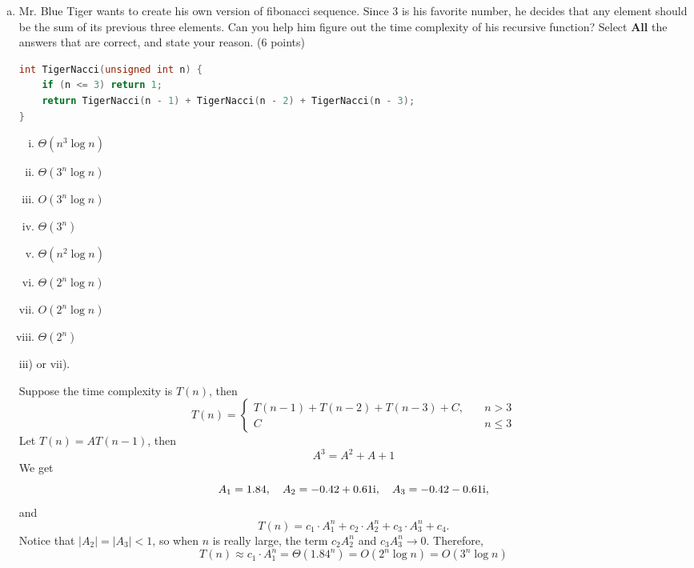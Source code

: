 \documentclass[11pt]{exam}
\begin{document}
\begin{enumerate}[(a)]
\item Mr. Blue Tiger wants to create his own version of fibonacci sequence. Since 3 is his favorite number, he decides that any element should be the sum of its previous three elements. Can you help him figure out the time complexity of his recursive function? Select \textbf{All} the answers that are correct, and state your reason. (6 points)
\begin{lstlisting}[language=c++]
int TigerNacci(unsigned int n) {
	if (n <= 3) return 1;
	return TigerNacci(n - 1) + TigerNacci(n - 2) + TigerNacci(n - 3);
}
\end{lstlisting}
\begin{enumerate}[i)]
\item $\Theta(n^{3}\log n)$
\item $\Theta(3^{n}\log n)$
\item $O(3^{n}\log n)$
\item $\Theta(3^{n})$
\item $\Theta(n^{2}\log n)$
\item $\Theta(2^{n}\log n)$
\item $O(2^{n}\log n)$
\item $\Theta(2^{n})$
\end{enumerate}
\begin{solution}
    iii) or vii).
    \par 
    Suppose the time complexity is $T(n)$, then 
    $$
        T(n) = 
        \begin{cases}
            T(n-1)  + T(n-2) + T(n-3) + C, &\quad n>3\\
            C &\quad n\leq 3 
        \end{cases}
    $$
    Let $T(n) = A T(n-1)$, then 
    $$
    A^3 = A^2 + A  + 1
    $$
    We get 
    $$
    A_1 = 1.84, \quad A_2 =-0.42 + 0.61 \mathrm{i},
    \quad A_3 = -0.42 - 0.61 \mathrm{i},
    $$
    and 
    $$
    T(n) = c_1 \cdot A_1^n + c_2 \cdot A_2^n + c_3 \cdot A_3^n + c_4.
    $$
    Notice that $|A_2| = |A_3| < 1$, so when $n$ is really large, the term $c_2 A_2^n$ and 
    $c_3 A_3^n \to 0$.
    Therefore,
    $$
    T(n) \approx c_1 \cdot A_1^n = \Theta(1.84^n) = O(2^n \log n) = O(3^n \log n)
    $$
\end{solution}


\end{enumerate}
\end{document}
